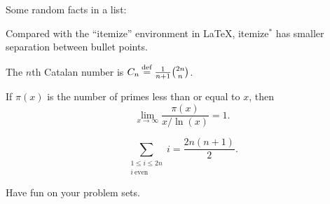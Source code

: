 \documentclass[12pt]{article}
\newenvironment{itemize*}%
  {\vspace{-2ex} \begin{itemize} %
     \setlength{\itemsep}{-1ex} \setlength{\parsep}{0pt}}%
  {\end{itemize}}
\newcommand{\eqdef}{\mathbin{\stackrel{\rm def}{=}}}
\begin{document}
Some random facts in a list:



\begin{itemize*}
\item Compared with the ``itemize'' environment in \LaTeX, itemize$^*$ has smaller separation between bullet points.
\item The $n$th Catalan number is $C_n \eqdef \frac{1}{n+1} \binom{2n}{n}$.
\item If $\pi(x)$ is the number of primes less than or equal to $x$, then
$$\lim_{x\rightarrow\infty} \frac{\pi(x)}{x/\ln(x)} = 1 . $$
\item $$ \sum_{\substack{1\le i\le 2n\\i\ \mathrm{even}}} i = \frac{2n(n+1)}2 .$$
\end{itemize*}

Have fun on your problem sets.
\end{document}
